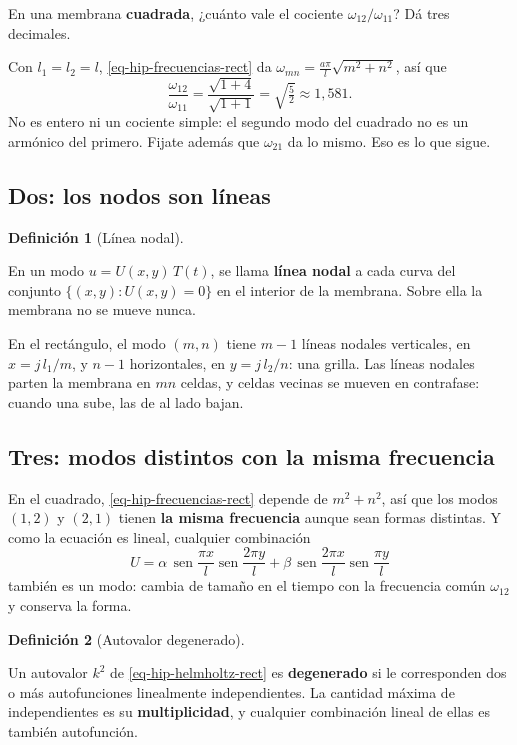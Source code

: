 \documentclass[
  spanish,
  a4paper,
]{scrbook}
\theoremstyle{definition}
\newtheorem{definition}{Definición}[chapter]
\theoremstyle{plain}
\theoremstyle{definition}
\theoremstyle{plain}
\theoremstyle{definition}
\theoremstyle{remark}
\begin{document}
En una membrana \textbf{cuadrada}, ¿cuánto vale el cociente
\(\omega_{12}/\omega_{11}\)? Dá tres decimales.

Con \(l_1 = l_2 = l\), \ref{eq-hip-frecuencias-rect} da
\(\omega_{mn} = \tfrac{a\pi}{l}\sqrt{m^2+n^2}\), así que
\[\frac{\omega_{12}}{\omega_{11}} = \frac{\sqrt{1+4}}{\sqrt{1+1}} = \sqrt{\tfrac52} \approx 1{,}581 .\]
No es entero ni un cociente simple: el segundo modo del cuadrado no es
un armónico del primero. Fijate además que \(\omega_{21}\) da lo mismo.
Eso es lo que sigue.

\subsection{Dos: los nodos son líneas}\label{sec-hip-lineas-nodales}

\begin{definition}[Línea
nodal]\protect\hypertarget{def-hip-linea-nodal}{}\label{def-hip-linea-nodal}

En un modo \(u = U(x,y)\,T(t)\), se llama \textbf{línea nodal} a cada
curva del conjunto \(\{(x,y): U(x,y) = 0\}\) en el interior de la
membrana. Sobre ella la membrana no se mueve nunca.

\end{definition}

En el rectángulo, el modo \((m,n)\) tiene \(m-1\) líneas nodales
verticales, en \(x = j\,l_1/m\), y \(n-1\) horizontales, en
\(y = j\,l_2/n\): una grilla. Las líneas nodales parten la membrana en
\(mn\) celdas, y celdas vecinas se mueven en contrafase: cuando una
sube, las de al lado bajan.

\subsection{Tres: modos distintos con la misma
frecuencia}\label{sec-hip-degeneracion}

En el cuadrado, \ref{eq-hip-frecuencias-rect} depende de \(m^2+n^2\),
así que los modos \((1,2)\) y \((2,1)\) tienen \textbf{la misma
frecuencia} aunque sean formas distintas. Y como la ecuación es lineal,
cualquier combinación \[
U = \alpha\,\operatorname{sen}\frac{\pi x}{l}\operatorname{sen}\frac{2\pi y}{l} + \beta\,\operatorname{sen}\frac{2\pi x}{l}\operatorname{sen}\frac{\pi y}{l}
\] también es un modo: cambia de tamaño en el tiempo con la frecuencia
común \(\omega_{12}\) y conserva la forma.

\begin{definition}[Autovalor
degenerado]\protect\hypertarget{def-hip-degeneracion}{}\label{def-hip-degeneracion}

Un autovalor \(k^2\) de \ref{eq-hip-helmholtz-rect} es
\textbf{degenerado} si le corresponden dos o más autofunciones
linealmente independientes. La cantidad máxima de independientes es su
\textbf{multiplicidad}, y cualquier combinación lineal de ellas es
también autofunción.

\end{definition}
\end{document}
